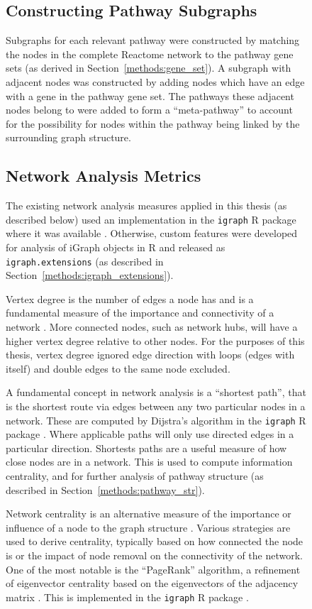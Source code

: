 \begin{figure}[!htp]
\subsection{Constructing Pathway Subgraphs} \label{methods:subgraphs}
Subgraphs for each relevant pathway were constructed by matching the nodes in the complete Reactome network to the pathway gene sets (as derived in Section~\ref{methods:gene_set}). A subgraph with adjacent nodes was constructed by adding nodes which have an edge with a gene in the pathway gene set. The pathways these adjacent nodes belong to were added to form a ``meta-pathway'' to account for the possibility for nodes within the pathway being linked by the surrounding graph structure.

\subsection{Network Analysis Metrics} \label{methods:network_metrics}
The existing network analysis measures applied in this thesis (as described below) used an implementation in the \texttt{igraph} R package where it was available \citep{igraph}. Otherwise, custom features were developed for analysis of iGraph objects in R and released as \texttt{igraph.extensions} (as described in Section~\ref{methods:igraph_extensions}).

Vertex degree is the number of edges a node has and is a fundamental measure of the importance and connectivity of a network \citep{vanSteen2010}. More connected nodes, such as network hubs, will have a higher vertex degree relative to other nodes. For the purposes of this thesis, vertex degree ignored edge direction with loops (edges with itself) and double edges to the same node excluded.

A fundamental concept in network analysis is a ``shortest path'', that is the shortest route via edges between any two particular nodes in a network. These are computed by Dijstra's algorithm \citep{Dijkstra1959} in the \texttt{igraph} R package \citep{igraph}. Where applicable paths will only use directed edges in a particular direction. Shortests paths are a useful measure of how close nodes are in a network. This is used to compute information centrality, and for further analysis of pathway structure (as described in Section~\ref{methods:pathway_str}).

Network centrality is an alternative measure of the importance or influence of a node to the graph structure \citep{Borgatti2005}. Various strategies are used to derive centrality,  typically based on how connected the node is or the impact of node removal on the connectivity of the network. One of the most notable is the ``PageRank'' algorithm, a refinement of eigenvector centrality based on the eigenvectors of the adjacency matrix \citep{Brin1998}. This is implemented in the \texttt{igraph} R package \citep{igraph}.


\end{figure}

